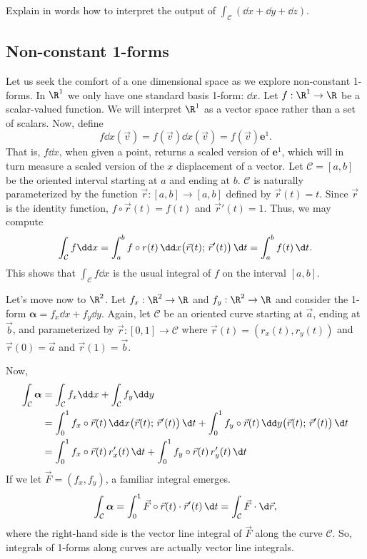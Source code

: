 \begin{exercise}
	Explain in words how to interpret
	the output of $\int_{\mathcal C} (\dd x+\dd y +\dd z)$.
\end{exercise}


\subsection{Non-constant 1-forms}

Let us seek the comfort of a one dimensional space as we explore non-constant 1-forms.
In $\R^1$ we only have one standard basis 1-form: $\dd x$.
Let $f:\R^1\to\R$ be a scalar-valued function.  We will interpret
$\R^1$ as a vector space rather than a set of scalars. Now, define
\[
	f\dd x (\vec v) = f(\vec v)\dd x(\vec v) = f(\vec v)\bm e^1.
\]
That is, $f\dd x$, when given a point, returns a scaled version of $\bm e^1$,
which will in turn measure a scaled version of the $x$ displacement of
a vector.  Let $\mathcal C=[a,b]$ be the oriented interval starting
at $a$ and ending at $b$.  $\mathcal C$ is naturally parameterized
by the function $\vec r:[a,b]\to[a,b]$ defined by $\vec r(t) = t$.
Since $\vec r$ is the identity function, $f\circ \vec r(t)=f(t)$ and
$\vec r'(t) = 1$.
Thus, we may compute
\[
	\int_{\mathcal C} f\dd x = \int_a^b f\circ r(t)\, \dd x\formarg{\vec r(t)}{\vec r'(t)}
	\,\d t
	=\int_a^b f(t)\,\d t.
\]
This shows that
$\int_{\mathcal C} f\dd x$ is the usual integral of $f$ on the interval $[a,b]$.

\bigskip
Let's move now to $\R^2$.  Let $f_x:\R^2\to\R$ and $f_y:\R^2\to\R$
and consider the 1-form $\bm\alpha = f_x\dd x+f_y\dd y$.  Again, let
$\mathcal C$ be an oriented curve starting at $\vec a$, ending at $\vec b$,
and parameterized by $\vec r:[0,1]\to\mathcal C$  where
$\vec r(t) = (r_x(t),r_y(t))$ and  $\vec r(0)=\vec a$ and
$\vec r(1)=\vec b$. 

Now,
\begin{align*}
	\int_{\mathcal C} \bm\alpha &= 
	\int_{\mathcal C} f_x\dd x+\int_{\mathcal C} f_y\dd y\\
	&=\int_0^1 f_x\circ \vec r(t)\, \dd x\formarg{\vec r(t)}{\vec r'(t)}\,\d t
	+\int_0^1 f_y\circ \vec r(t)\, \dd y\formarg{\vec r(t)}{\vec r'(t)}\,\d t\\
	&= \int_0^1 f_x\circ \vec r(t)\, r_x'(t)\,\d t
	+\int_0^1 f_y\circ \vec r(t)\, r_y'(t)\,\d t
\end{align*}
If we let $\vec F = (f_x,f_y)$, a familiar integral emerges.
\[
	\int_{\mathcal C} \bm\alpha = \int_0^1 \vec F\circ \vec r(t) \cdot \vec r'(t)\,\d t
	=\int_{\mathcal C} \vec F\cdot \d\vec r,
\]
where the right-hand side is the vector line integral of $\vec F$ along the curve
$\mathcal C$.  So, integrals of 1-forms along curves are actually vector line
integrals.

